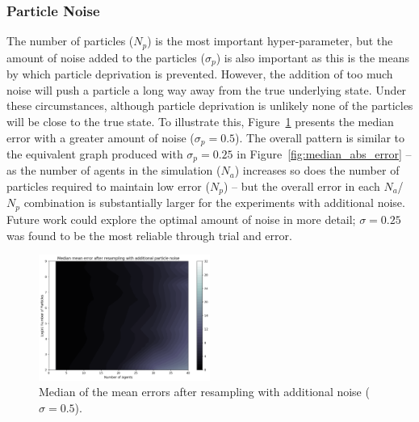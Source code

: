 \subsubsection{Particle Noise}

The number of particles ($N_p$) is the most important hyper-parameter, but the amount of noise added to the particles ($\sigma_p$) is also important as this is the means by which particle deprivation is prevented. However, the addition of too much noise will push a particle a long way away from the true underlying state. Under these circumstances, although particle deprivation is unlikely none of the particles will be close to the true state. To illustrate this, Figure~\ref{fig:median_abs_error-noise2.0} presents the median error with a greater amount of noise ($\sigma_p=0.5$). The overall pattern is similar to the equivalent graph produced with $\sigma_p=0.25$ in Figure~\ref{fig:median_abs_error} -- as the number of agents in the simulation ($N_a$) increases so does the number of particles required to maintain low error ($N_p$)  -- but the overall error in each $N_a$/$N_p$ combination is substantially larger for the experiments with additional noise. Future work could explore the optimal amount of noise in more detail; $\sigma=0.25$ was found to be the most reliable through trial and error.

\begin{figure}[ht]
	\centering
	\includegraphics[width=0.5\textwidth]{figures/results/median_abs_error-noise2_0}
	\caption{Median of the mean errors after resampling with additional noise ($\sigma=0.5$).} \label{fig:median_abs_error-noise2.0}
\end{figure}

